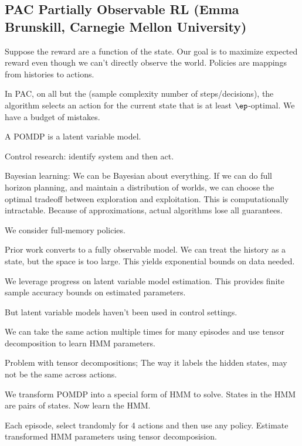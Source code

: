  

\subsection{PAC Partially Observable RL
(Emma Brunskill, Carnegie Mellon University)}

Suppose the reward are a function of the state. Our goal is to maximize expected reward even though we can't directly observe the world. Policies are mappings from histories to actions.

In PAC, on all but the (sample complexity number of steps/decisions), the algorithm selects an action for the current state that is at least $\ep$-optimal. We have a budget of mistakes.

A POMDP is a latent variable model.

 Control research: identify system and then act.
 
Bayesian learning: We can be Bayesian about everything. If we can do full horizon planning, and maintain a distribution of worlds, we can choose the optimal tradeoff between exploration and exploitation. This is computationally intractable. Because of approximations, actual algorithms lose all guarantees. %

We consider full-memory policies. 

Prior work converts to a fully observable model. We can treat the history as a state, but the space is too large. This yields exponential bounds on data needed.

We leverage progress on latent variable model estimation. This provides finite sample accuracy bounds on estimated parameters.


But latent variable models haven't been used in control settings.

We can take the same action multiple times for many episodes and use tensor decomposition to learn HMM parameters.

Problem with tensor decompositions; The way it labels the hidden states, may not be the same across actions.

We transform POMDP into a special form of HMM to solve. States in the HMM are pairs of states. Now learn the HMM.


Each episode, select trandomly for 4 actions and then use any policy.
Estimate transformed HMM parameters using tensor decomposision.


